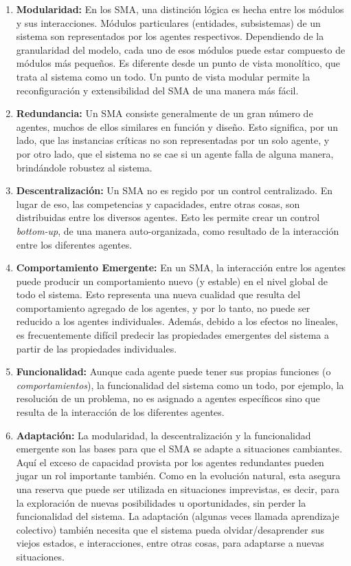 \begin{enumerate}
\item \textbf{Modularidad:} En los SMA, una distinción lógica es hecha entre los módulos y
sus interacciones. Módulos particulares (entidades, subsistemas) de un sistema
son representados por los agentes respectivos. Dependiendo de la granularidad
del modelo, cada uno de esos módulos puede estar compuesto de módulos más
pequeños. Es diferente desde un punto de vista monolítico, que trata al sistema
como un todo. Un punto de vista modular permite la reconfiguración y
extensibilidad del SMA de una manera más fácil.
\item \textbf{Redundancia:} Un SMA consiste
generalmente de un gran número de agentes, muchos de ellos similares en función
y diseño. Esto significa, por un lado, que las instancias críticas no son
representadas por un solo agente, y por otro lado, que el sistema no se cae si
un agente falla de alguna manera, brindándole robustez al sistema.
\item \textbf{Descentralización:} Un SMA no es regido por un control centralizado. En lugar de
eso, las competencias y capacidades, entre otras cosas, son distribuidas entre
los diversos agentes. Esto les permite crear un control \textit{bottom-up}, de una
manera auto-organizada, como resultado de la interacción entre los diferentes
agentes.
\item \textbf{Comportamiento Emergente:} En un SMA, la interacción entre los
agentes puede producir un comportamiento nuevo (y estable) en el nivel global de
todo el sistema. Esto representa una nueva cualidad que resulta del
comportamiento agregado de los agentes, y por lo tanto, no puede ser reducido a
los agentes individuales. Además, debido a los efectos no lineales, es
frecuentemente difícil predecir las propiedades emergentes del sistema a partir
de las propiedades individuales.
\item \textbf{Funcionalidad:} Aunque cada agente puede
tener sus propias funciones (o \textit{comportamientos}), la funcionalidad del sistema
como un todo, por ejemplo, la resolución de un problema, no es asignado a
agentes específicos sino que resulta de la interacción de los diferentes
agentes.
\item \textbf{Adaptación:} La modularidad, la descentralización y la funcionalidad
emergente son las bases para que el SMA se adapte a situaciones cambiantes. Aquí
el exceso de capacidad provista por los agentes redundantes pueden jugar un rol
importante también. Como en la evolución natural, esta asegura una reserva que
puede ser utilizada en situaciones imprevistas, es decir, para la exploración de
nuevas posibilidades u oportunidades, sin perder la funcionalidad del sistema.
La adaptación (algunas veces llamada aprendizaje colectivo) también necesita que
el sistema pueda olvidar/desaprender sus viejos estados, e interacciones, entre
otras cosas, para adaptarse a nuevas situaciones.
\end{enumerate}

